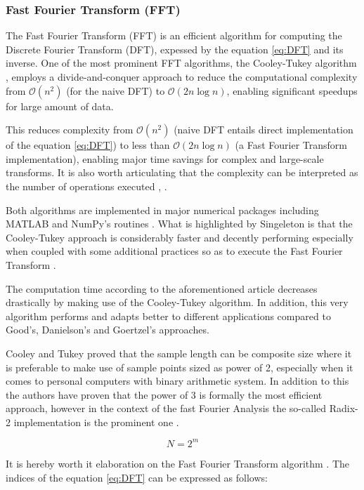 \subsubsection{Fast Fourier Transform (FFT)}
{
The Fast Fourier Transform (FFT) is an efficient algorithm for computing the Discrete Fourier Transform (DFT), expessed by the equation \eqref{eq:DFT} and its inverse. One of the most prominent FFT algorithms, the Cooley-Tukey algorithm \cite{CooleyTukey1965}, employs a divide-and-conquer approach to reduce the computational complexity from $\mathcal{O}(n^2)$ (for the naive DFT) to $\mathcal{O}(2 n \log n)$, enabling significant speedups for large amount of data.

This reduces complexity from $\mathcal{O}(n^2)$ (naive DFT entails direct implementation of the equation \eqref{eq:DFT}) to less than $\mathcal{O}(2 n \log n)$ (a Fast Fourier Transform implementation), enabling major time savings for complex and large-scale transforms. It is also worth articulating that the complexity can be interpreted as the number of operations executed \cite{CooleyTukey1965}, \cite{Singeleton1967}. 

Both algorithms are implemented in major numerical packages including MATLAB and NumPy's routines \cite{FFT}. What is highlighted  by Singeleton is that the Cooley-Tukey approach is considerably faster and decently performing especially when coupled with some additional practices so as to execute the Fast Fourier Transform \cite{Singeleton1967}. 

The computation time according to the aforementioned article decreases drastically by making use of the Cooley-Tukey algorithm. In addition, this very algorithm performs and adapts better to different applications compared to Good's, Danielson's and Goertzel's approaches.

Cooley and Tukey proved that the sample length can be composite size where it is preferable to make use of sample points sized as power of 2, especially when it comes to personal computers with binary arithmetic system. In addition to this the authors have proven that the power of 3 is formally the most efficient approach, however in the context of the fast Fourier Analysis the so-called Radix-2 implementation is the prominent one \cite{CooleyTukey1965}.

\begin{equation}
	N = 2^m \label{eq:radix_condition}
\end{equation} 

It is hereby worth it elaboration on the Fast Fourier Transform algorithm \cite{CooleyTukey1965}. The indices of the equation \eqref{eq:DFT} can be expressed as follows: 

}
